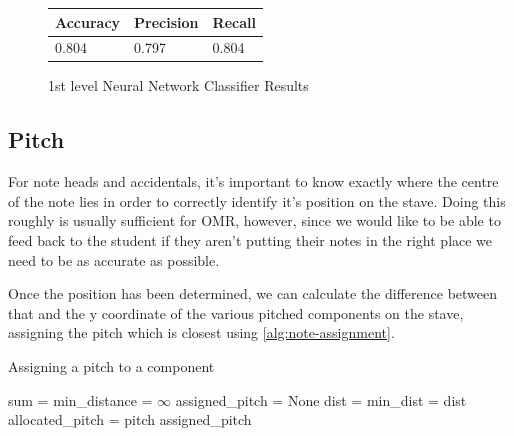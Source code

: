 \begin{figure}[H]
  \vspace{0.8cm}
  
  \begin{subtable}[b]{.4\linewidth}
    \begin{tabularx}{\linewidth}{lll}
      \toprule
      Accuracy & Precision & Recall \\
      \midrule
      0.804 & 0.797 & 0.804 \\
      \bottomrule
    \end{tabularx}
  \end{subtable}
  
  \vspace{0.4cm}
  
  \caption{1st level Neural Network Classifier Results}
  \label{fig:nn-classification-data}
\end{figure}


\subsection{Pitch}
\label{sec:pitch-identification}

For note heads and accidentals, it's important to know exactly where the centre of the note lies in order to correctly identify it's position on the stave. Doing this roughly is usually sufficient for OMR, however, since we would like to be able to feed back to the student if they aren't putting their notes in the right place  we need to be as accurate as possible.

Once the position has been determined, we can calculate the difference between that and the y coordinate of the various pitched components on the stave, assigning the pitch which is closest using \cref{alg:note-assignment}.

\begin{algorithm}[H]
\caption{Assigning a pitch to a component}
\label{alg:note-assignment}
\begin{algorithmic}[1]
    \State sum = 
    \State min\_distance = $\infty$
    \State assigned\_pitch = None
      \State dist = 
        \State min\_dist = dist
        \State allocated\_pitch = pitch
      \EndIf
	\EndFor
	\Return assigned\_pitch
\EndProcedure
\end{algorithmic}
\end{algorithm}

